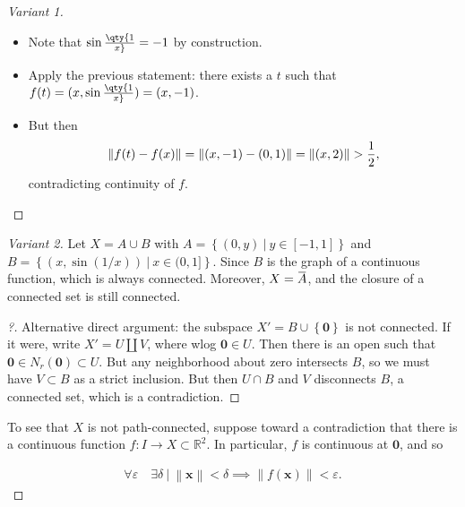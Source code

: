 \begin{solution}
\begin{proof}[Variant 1]
\begin{itemize}
\begin{itemize}
    \begin{itemize}
    \tightlist
    \item
      Note that \(\sin\qty{1\over x} = -1\) by construction.
    \item
      Apply the previous statement: there exists a \(t\) such that
      \(f(t) = (x, \sin\qty{1\over x}) = (x, -1)\).
    \item
      But then
      \begin{align*}
      {\left\lVert {f(t) - f(x)} \right\rVert} = {\left\lVert {(x, -1) - (0, 1)} \right\rVert} = {\left\lVert {(x, 2)} \right\rVert} > {1\over 2}
      ,\end{align*}
      contradicting continuity of \(f\).
    \end{itemize}
  \end{itemize}
\end{itemize}

\end{proof}

\begin{proof}[Variant 2]

Let \(X = A \cup B\) with
\(A = \left\{{(0, y) {~\mathrel{\Big|}~}y\in [-1, 1] }\right\}\) and
\(B = \left\{{(x, \sin(1/x)) {~\mathrel{\Big|}~}x\in (0, 1]}\right\}\).
Since \(B\) is the graph of a continuous function, which is always
connected. Moreover,
\(X = \mkern 1.5mu\overline{\mkern-1.5muA\mkern-1.5mu}\mkern 1.5mu\),
and the closure of a connected set is still connected.

\begin{proof}[?]

Alternative direct argument: the subspace
\(X' = B \cup\left\{{\mathbf{0}}\right\}\) is not connected. If it were,
write \(X' = U {\coprod}V\), where wlog \(\mathbf{0} \in U\). Then there
is an open such that \(\mathbf{0} \in N_r(\mathbf{0}) \subset U\). But
any neighborhood about zero intersects \(B\), so we must have
\(V \subset B\) as a strict inclusion. But then \(U \cap B\) and \(V\)
disconnects \(B\), a connected set, which is a contradiction.

\end{proof}

To see that \(X\) is not path-connected, suppose toward a contradiction
that there is a continuous function
\(f: I \to X \subset {\mathbb{R}}^2\). In particular, \(f\) is
continuous at \(\mathbf{0}\), and so

\begin{align*} \forall \varepsilon \quad \exists \delta {~\mathrel{\Big|}~}{\left\lVert {\mathbf{x}} \right\rVert} < \delta \implies {\left\lVert {f(\mathbf{x})} \right\rVert} < \varepsilon .\end{align*}


\end{proof}
\end{solution}
